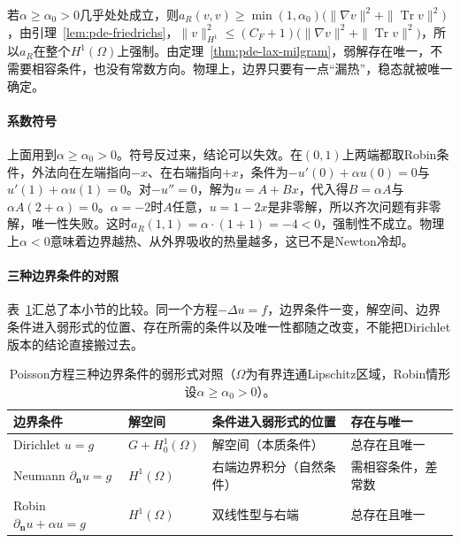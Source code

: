 若$\alpha\geq\alpha_0>0$几乎处处成立，则$a_R(v,v)\geq\min(1,\alpha_0)\bigl(\|\nabla v\|^2+\|\operatorname{Tr}v\|^2\bigr)$，由引理~\ref{lem:pde-friedrichs}，$\|v\|_{H^1}^2\leq(C_F+1)\bigl(\|\nabla v\|^2+\|\operatorname{Tr}v\|^2\bigr)$，所以$a_R$在整个$H^1(\Omega)$上强制。由定理~\ref{thm:pde-lax-milgram}，弱解存在唯一，不需要相容条件，也没有常数方向。物理上，边界只要有一点“漏热”，稳态就被唯一确定。

\paragraph{系数符号}
上面用到$\alpha\geq\alpha_0>0$。符号反过来，结论可以失效。在$(0,1)$上两端都取Robin条件，外法向在左端指向$-x$、在右端指向$+x$，条件为$-u'(0)+\alpha u(0)=0$与$u'(1)+\alpha u(1)=0$。对$-u''=0$，解为$u=A+Bx$，代入得$B=\alpha A$与$\alpha A(2+\alpha)=0$。$\alpha=-2$时$A$任意，$u=1-2x$是非零解，所以齐次问题有非零解，唯一性失败。这时$a_R(1,1)=\alpha\cdot(1+1)=-4<0$，强制性不成立。物理上$\alpha<0$意味着边界越热、从外界吸收的热量越多，这已不是Newton冷却。

\paragraph{三种边界条件的对照}
表~\ref{tab:pde-boundary-comparison}汇总了本小节的比较。同一个方程$-\Delta u=f$，边界条件一变，解空间、边界条件进入弱形式的位置、存在所需的条件以及唯一性都随之改变，不能把Dirichlet版本的结论直接搬过去。

\begin{table}[!htb]
  \centering
  \begin{tabularx}{\linewidth}{@{}l>{\RaggedRight\arraybackslash}X>{\RaggedRight\arraybackslash}X>{\RaggedRight\arraybackslash}X@{}}
    \toprule
    边界条件 & 解空间 & 条件进入弱形式的位置 & 存在与唯一 \\
    \midrule
    Dirichlet $u=g$ & $G+H_0^1(\Omega)$ & 解空间（本质条件） & 总存在且唯一 \\
    Neumann $\partial_{\bm n}u=g$ & $H^1(\Omega)$ & 右端边界积分（自然条件） & 需相容条件，差常数 \\
    Robin $\partial_{\bm n}u+\alpha u=g$ & $H^1(\Omega)$ & 双线性型与右端 & 总存在且唯一 \\
    \bottomrule
  \end{tabularx}
  \caption{Poisson方程三种边界条件的弱形式对照（$\Omega$为有界连通Lipschitz区域，Robin情形设$\alpha\geq\alpha_0>0$）。}
  \label{tab:pde-boundary-comparison}
\end{table}
